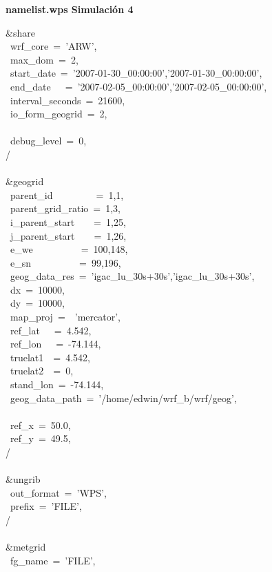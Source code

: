 
\textbf{namelist.wps Simulación 4}

\&share\\
~wrf\_core~=~'ARW',\\
~max\_dom~=~2,\\
~start\_date~=~'2007-01-30\_00:00:00','2007-01-30\_00:00:00',\\
~end\_date~~~=~'2007-02-05\_00:00:00','2007-02-05\_00:00:00',\\
~interval\_seconds~=~21600,\\
~io\_form\_geogrid~=~2,\\
\\
~debug\_level~=~0,\\
/\\
\\
\&geogrid\\
~parent\_id~~~~~~~~~=~1,1,\\
~parent\_grid\_ratio~=~1,3,\\
~i\_parent\_start~~~~=~1,25,\\
~j\_parent\_start~~~~=~1,26,\\
~e\_we~~~~~~~~~~=~100,148,\\
~e\_sn~~~~~~~~~~=~99,196,\\
~geog\_data\_res~=~'igac\_lu\_30s+30s','igac\_lu\_30s+30s',\\
~dx~=~10000,\\
~dy~=~10000,\\
~map\_proj~=~~'mercator',\\
~ref\_lat~~~=~4.542,\\
~ref\_lon~~~=~-74.144,\\
~truelat1~~=~4.542,\\
~truelat2~~=~0,\\
~stand\_lon~=~-74.144,\\
~geog\_data\_path~=~'/home/edwin/wrf\_b/wrf/geog',\\
\\
~ref\_x~=~50.0,\\
~ref\_y~=~49.5,\\
/\\
\\
\&ungrib\\
~out\_format~=~'WPS',\\
~prefix~=~'FILE',\\
/\\
\\
\&metgrid\\
~fg\_name~=~'FILE',\\
